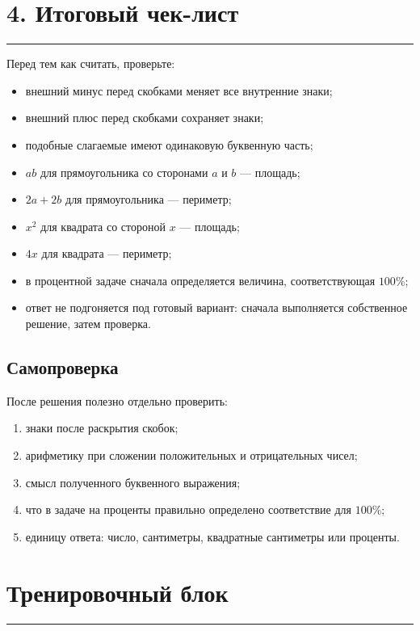 \documentclass[a4paper,12pt]{article}
\newcommand{\sectionline}{\vspace{-0.35em}\noindent\textcolor{accent}{\rule{\linewidth}{0.6pt}}\vspace{0.35em}}
\begin{document}
\clearpage

\section*{4. Итоговый чек-лист}
\sectionline

Перед тем как считать, проверьте:
\begin{itemize}
  \item внешний минус перед скобками меняет все внутренние знаки;
  \item внешний плюс перед скобками сохраняет знаки;
  \item подобные слагаемые имеют одинаковую буквенную часть;
  \item $ab$ для прямоугольника со сторонами $a$ и $b$ --- площадь;
  \item $2a+2b$ для прямоугольника --- периметр;
  \item $x^2$ для квадрата со стороной $x$ --- площадь;
  \item $4x$ для квадрата --- периметр;
  \item в процентной задаче сначала определяется величина,
        соответствующая $100\%$;
  \item ответ не подгоняется под готовый вариант:
        сначала выполняется собственное решение, затем проверка.
\end{itemize}

\subsection*{Самопроверка}

После решения полезно отдельно проверить:
\begin{enumerate}
  \item знаки после раскрытия скобок;
  \item арифметику при сложении положительных и отрицательных чисел;
  \item смысл полученного буквенного выражения;
  \item что в задаче на проценты правильно определено соответствие
        для $100\%$;
  \item единицу ответа:
        число, сантиметры, квадратные сантиметры или проценты.
\end{enumerate}

\clearpage

\section*{Тренировочный блок}
\sectionline
\end{document}
